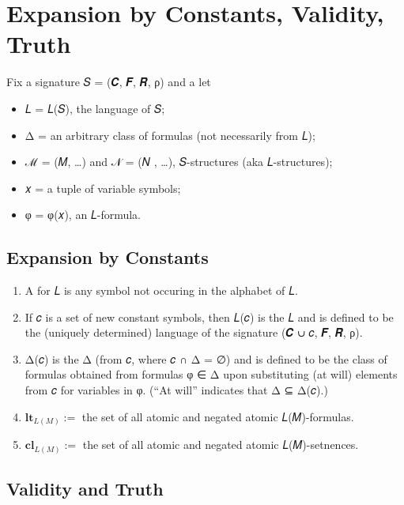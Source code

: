 \documentclass[a4paper,UKenglish,cleveref,autoref,thm-restate,12pt]{lipics-v2021-wjd}
\newcommand{\<}{\langle}
\renewcommand{\>}{\rangle}
\begin{document}
\section{Expansion by Constants, Validity, Truth}\label{expansion-by-constants-validity-truth}

Fix a signature 𝑆 = (𝑪, 𝑭, 𝑹, ρ) and a let
\begin{itemize}
\item 
  𝐿 = 𝐿(𝑆), the language of 𝑆;
\item 
  Δ = an arbitrary class of formulas (not necessarily from 𝐿);
\item
  ℳ = (𝑀, …) and 𝒩 = (𝑁 , …), 𝑆-structures (aka 𝐿-structures);
\item 
  𝑥 = a tuple of variable symbols;
\item
  φ = φ(𝑥), an 𝐿-formula.
\end{itemize}

\subsection{Expansion by Constants}\label{expansion-by-constants}

\begin{enumerate}
\item
  A  for 𝐿 is any symbol not occuring in the alphabet of 𝐿.
\item
  If 𝑐 is a set of new constant symbols, then 𝐿(𝑐) is the  𝐿
   and is defined to be the (uniquely determined) language of
  the signature (𝑪 ∪ 𝑐, 𝑭, 𝑹, ρ).
\item
  Δ(𝑐) is the  Δ  (from 𝑐, where 𝑐 ∩ Δ
  = ∅) and is defined to be the class of formulas obtained from formulas φ ∈ Δ
  upon substituting (at will) elements from 𝑐 for variables in φ. (``At will''
  indicates that Δ ⊆ Δ(𝑐).)
\item
  \(\mathbf{lt}_{L(M)}:=\) the set of all atomic and negated atomic 𝐿(𝑀)-formulas.
\item
  \(\mathbf{cl}_{L(M)}:=\) the set of all atomic and negated atomic 𝐿(𝑀)-setnences.
\end{enumerate}


\subsection{Validity and Truth}\label{validity-and-truth}
\end{document}
